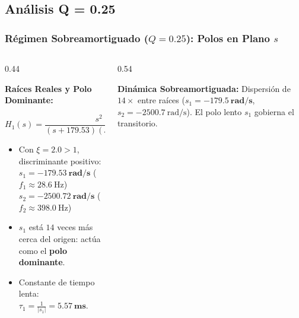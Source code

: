 \subsection{Análisis Q = 0.25}
\begin{frame}
  \frametitle{Régimen Sobreamortiguado ($Q = 0.25$): Polos en Plano $s$}

  \begin{columns}[c, onlytextwidth]
    \begin{column}{0.44\textwidth}
      \begin{tarjeta}
        {\fontsize{9pt}{11pt}\selectfont \textbf{\color{NavyDark} Raíces Reales y Polo Dominante:}}\\[2pt]
        {\fontsize{7.5pt}{9.2pt}\selectfont
        \[ H_1(s) = \frac{s^2}{(s + 179.53)(s + 2500.72)} \]
        \begin{itemize}\setlength{\itemsep}{2pt}
          \item Con $\xi = 2.0 > 1$, discriminante positivo:
          $s_1 = \mathbf{-179.53\ \unit{\radian\per\second}}$ ($f_1 \approx \qty{28.6}{\hertz}$)\\
          $s_2 = \mathbf{-2500.72\ \unit{\radian\per\second}}$ ($f_2 \approx \qty{398.0}{\hertz}$)
          \item $s_1$ está $14$ veces más cerca del origen: actúa como el \textbf{polo dominante}.
          \item Constante de tiempo lenta: $\tau_1 = \frac{1}{|s_1|} = \mathbf{\qty{5.57}{\milli\second}}$.
        \end{itemize}
        }
      \end{tarjeta}
    \end{column}

    \begin{column}{0.54\textwidth}
      \centering
      \vspace{3pt}
      \begin{tarjeta}[colframe=CardBorder, colback=CardBg, boxrule=0.5pt, top=3pt, bottom=3pt, left=5pt, right=5pt]
        {\fontsize{7.5pt}{9pt}\selectfont
        \textbf{\color{NavyDark} Dinámica Sobreamortiguada:} Dispersión de $14\times$ entre raíces ($s_1 = \mathbf{-179.5\ \text{rad/s}}$, $s_2 = -2500.7\ \text{rad/s}$). El polo lento $s_1$ gobierna el transitorio.
        }
      \end{tarjeta}
    \end{column}
  \end{columns}
\end{frame}

